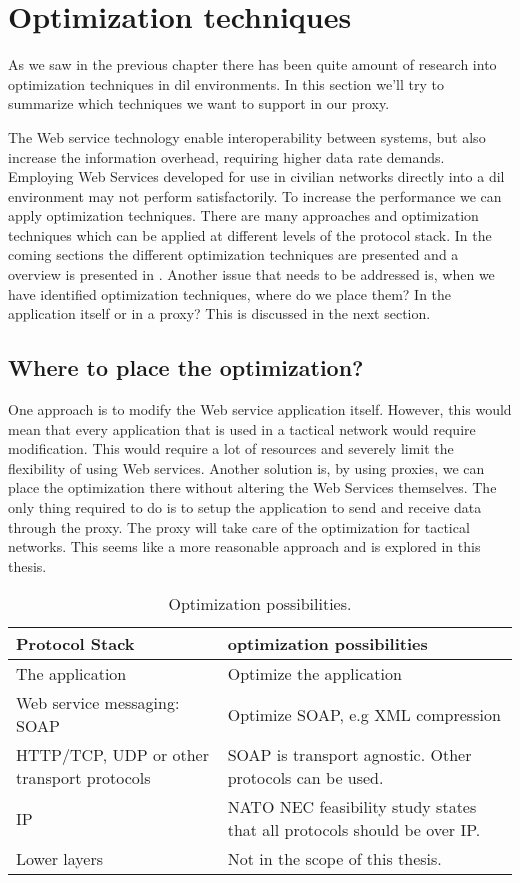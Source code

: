 \section{Optimization techniques}

As we saw in the previous chapter there has been quite amount of research into
optimization techniques in \gls{dil} environments. In this section we'll try to
summarize which techniques we want to support in our proxy.

The Web service technology enable interoperability between systems, but also
increase the information overhead, requiring higher data rate demands. Employing
Web Services developed for use in civilian networks directly into a \gls{dil}
environment may not perform satisfactorily. To increase the performance we can
apply optimization techniques. There are many approaches and optimization
techniques which can be applied at different levels of the protocol stack. In
the coming sections the different optimization techniques are presented and a
overview is presented in . Another issue
that needs to be addressed is, when we have identified optimization techniques,
where do we place them? In the application itself or in a proxy? This is
discussed in the next section.

\subsection{Where to place the optimization?}
One approach is to modify the Web service application itself. However, this
would mean that every application that is used in a tactical network would
require modification. This would require a lot of resources and severely limit
the flexibility of using Web services. Another solution is, by using proxies, we
can place the optimization there without altering the Web Services themselves.
The only thing required to do is to setup the application to send and receive
data through the proxy. The proxy will take care of the optimization for
tactical networks. This seems like a more reasonable approach and is explored in
this thesis.


\begin{table}[h]
\begin{tabularx}{\textwidth}{| X | X |}
\hline
  \textbf{Protocol Stack} & \textbf{optimization possibilities} \\ \hline
  The application & Optimize the application\\ \hline
  Web service messaging: SOAP & Optimize SOAP, e.g XML compression \\ \hline
  HTTP/TCP, UDP or other transport protocols & SOAP is transport agnostic. Other
  protocols can be used. \\ \hline
  IP & NATO NEC feasibility study states that all protocols should be over IP. \\
  \hline
  Lower layers & Not in the scope of this thesis. \\ \hline
\end{tabularx}
\caption{Optimization possibilities.} \label{table:optimalization-overview}
\end{table}


